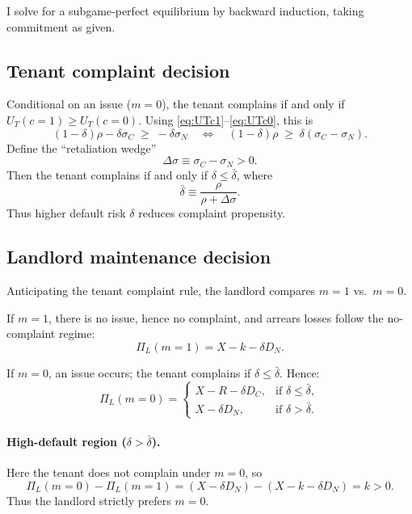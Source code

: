 \documentclass[11pt]{article}
\begin{document}
I solve for a subgame-perfect equilibrium by backward induction, taking commitment as given.

\subsection{Tenant complaint decision}

Conditional on an issue ($m=0$), the tenant complains if and only if $U_T(c=1) \ge U_T(c=0)$. Using \eqref{eq:UTc1}--\eqref{eq:UTc0}, this is
\[
  (1-\delta)\rho - \delta \sigma_C \;\ge\; -\delta \sigma_N
  \quad \Longleftrightarrow \quad
  (1-\delta)\rho \;\ge\; \delta(\sigma_C-\sigma_N).
\]
Define the ``retaliation wedge''
\[
  \Delta \sigma \equiv \sigma_C - \sigma_N > 0.
\]
Then the tenant complains if and only if $\delta \le \bar\delta$, where
\begin{equation}
  \bar\delta \equiv \frac{\rho}{\rho + \Delta\sigma}. \label{eq:deltabar}
\end{equation}
Thus higher default risk $\delta$ reduces complaint propensity.

\subsection{Landlord maintenance decision}

Anticipating the tenant complaint rule, the landlord compares $m=1$ vs.\ $m=0$.

If $m=1$, there is no issue, hence no complaint, and arrears losses follow the no-complaint regime:
\begin{equation}
  \Pi_L(m=1) = X - k - \delta D_N. \label{eq:Pi_m1}
\end{equation}

If $m=0$, an issue occurs; the tenant complains if $\delta \le \bar\delta$. Hence:
\begin{equation}
  \Pi_L(m=0) =
  \begin{cases}
    X - R - \delta D_C, & \text{if } \delta \le \bar\delta,\\
    X - \delta D_N, & \text{if } \delta > \bar\delta.
  \end{cases}
  \label{eq:Pi_m0}
\end{equation}

\paragraph{High-default region ($\delta > \bar\delta$).}
Here the tenant does not complain under $m=0$, so
\[
  \Pi_L(m=0) - \Pi_L(m=1) = (X - \delta D_N) - (X - k - \delta D_N) = k > 0.
\]
Thus the landlord strictly prefers $m=0$.
\end{document}

